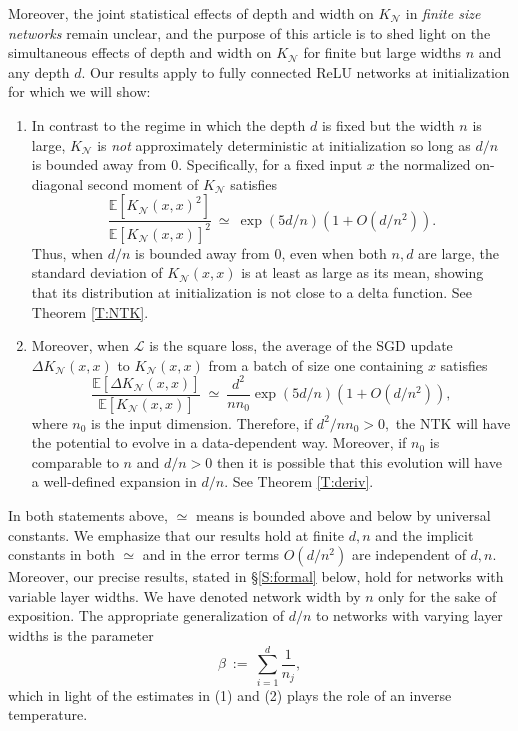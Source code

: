 \documentclass[11pt, reqno]{amsart}
\newcommand{\E}[1]{{\mathbb E}\left [#1\right]}
\newcommand{\lr}[1]{\ensuremath{\left(#1 \right)}}
\newcommand{\mN}{\mathcal N}
\begin{document}
Moreover, the joint statistical effects of depth and width on $K_{\mN}$ in \textit{finite size networks} remain unclear, and the purpose of this article is to shed light on the simultaneous effects of depth and width on $K_{\mN}$ for finite but large widths $n$ and any depth $d$. Our results apply to fully connected ReLU networks at initialization for which we will show:
\begin{enumerate}
\item In contrast to the regime in which the depth $d$ is fixed but the width $n$ is large, $K_{\mN}$ is \textit{not} approximately deterministic at initialization so long as $d/n$ is bounded away from $0$. Specifically, for a fixed input $x$ the normalized on-diagonal second moment of $K_{\mN}$ satisfies
\[\frac{\E{K_{\mN}(x,x)^2}}{\E{K_{\mN}(x,x)}^2}~\simeq~\exp(5 d/n)\lr{1+O(d/n^2)}.\]
Thus, when $d/n$ is bounded away from $0$, even when both $n,d$ are large, the standard deviation of $K_{\mN}(x,x)$ is at least as large as its mean, showing that its distribution at initialization is not close to a delta function. See Theorem \ref{T:NTK}.\\
\item Moreover, when $\mathcal L$ is the square loss, the average of the SGD update $\Delta K_{\mN}(x,x)$ to $K_{\mN}(x,x)$ from a batch of size one containing $x$ satisfies
\[\frac{\E{\Delta K_{\mN}(x,x)}}{\E{K_{\mN}(x,x)}}~\simeq~\frac{d^2}{n n_0}\exp(5 d/n)\lr{1+O(d/n^2)},\]
where $n_0$ is the input dimension. Therefore, if $d^2/nn_0>0,$ the NTK will have the potential to evolve in a data-dependent way. Moreover, if $n_0$ is comparable to $n$ and $d/n>0$ then it is possible that this evolution will have a well-defined expansion in $d/n.$ See Theorem \ref{T:deriv}. 
\end{enumerate}
In both statements above, $\simeq$ means is bounded above and below by universal constants. We emphasize that our results hold at finite $d,n$ and the implicit constants in both $\simeq$ and in the error terms $O(d/n^2)$ are independent of $d,n.$ Moreover, our precise results, stated in \S \ref{S:formal} below, hold for networks with variable layer widths. We have denoted network width by $n$ only for the sake of exposition. The appropriate generalization of $d/n$ to networks with varying layer widths is the parameter
\[\beta~:=~\sum_{i=1}^d \frac{1}{n_j},\]
which in light of the estimates in (1) and (2) plays the role of an inverse temperature. 
\end{document}
